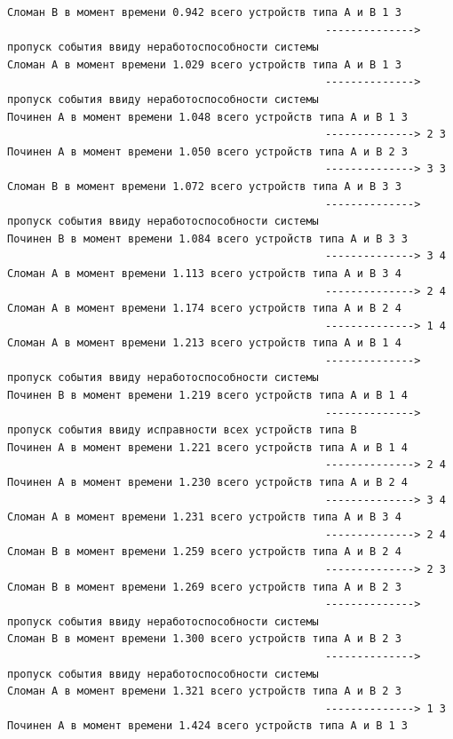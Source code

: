 \begin{verbatim}
Сломан B в момент времени 0.942 всего устройств типа А и В 1 3
                                                  --------------> пропуск события ввиду неработоспособности системы
Сломан A в момент времени 1.029 всего устройств типа А и В 1 3
                                                  --------------> пропуск события ввиду неработоспособности системы
Починен A в момент времени 1.048 всего устройств типа А и В 1 3
                                                  --------------> 2 3
Починен A в момент времени 1.050 всего устройств типа А и В 2 3
                                                  --------------> 3 3
Сломан B в момент времени 1.072 всего устройств типа А и В 3 3
                                                  --------------> пропуск события ввиду неработоспособности системы
Починен B в момент времени 1.084 всего устройств типа А и В 3 3
                                                  --------------> 3 4
Сломан A в момент времени 1.113 всего устройств типа А и В 3 4
                                                  --------------> 2 4
Сломан A в момент времени 1.174 всего устройств типа А и В 2 4
                                                  --------------> 1 4
Сломан A в момент времени 1.213 всего устройств типа А и В 1 4
                                                  --------------> пропуск события ввиду неработоспособности системы
Починен B в момент времени 1.219 всего устройств типа А и В 1 4
                                                  --------------> пропуск события ввиду исправности всех устройств типа В
Починен A в момент времени 1.221 всего устройств типа А и В 1 4
                                                  --------------> 2 4
Починен A в момент времени 1.230 всего устройств типа А и В 2 4
                                                  --------------> 3 4
Сломан A в момент времени 1.231 всего устройств типа А и В 3 4
                                                  --------------> 2 4
Сломан B в момент времени 1.259 всего устройств типа А и В 2 4
                                                  --------------> 2 3
Сломан B в момент времени 1.269 всего устройств типа А и В 2 3
                                                  --------------> пропуск события ввиду неработоспособности системы
Сломан B в момент времени 1.300 всего устройств типа А и В 2 3
                                                  --------------> пропуск события ввиду неработоспособности системы
Сломан A в момент времени 1.321 всего устройств типа А и В 2 3
                                                  --------------> 1 3
Починен A в момент времени 1.424 всего устройств типа А и В 1 3

\end{verbatim}
